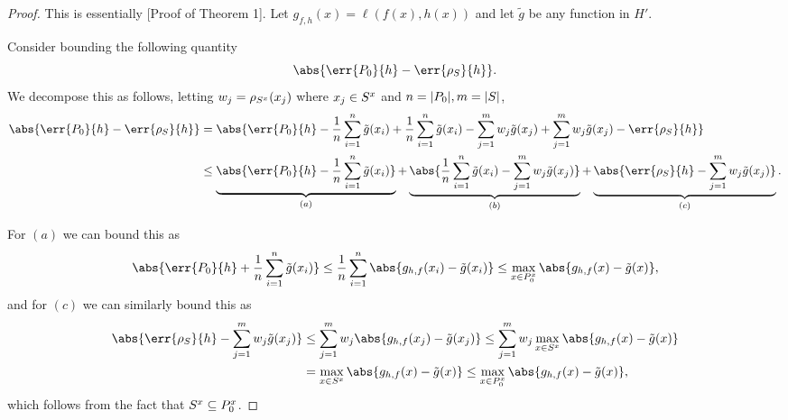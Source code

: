\begin{proof}
  This is essentially \cite{viering17_nuclear_discr_activ_learn}[Proof of Theorem 1].
  Let \(g_{f, h}(x) = \ell(f(x), h(x))\) and let \(\tilde{g}\) be any function in
  \(H'\).

  Consider bounding the following quantity
  \begin{equation*}
    \abs{\err{\poolset_0}{h} - \err{\rho_{\trainset}}{h}}.
  \end{equation*}
  We decompose this as follows, letting \(w_{j} = \rho_{S^x}(x_j)\) where
  \(x_j \in S^x\) and \(n = |P_0|, m = |S|\),
  \begin{align*}
    \abs{\err{\poolset_0}{h} - \err{\rho_{\trainset}}{h}} & = \abs{\err{\poolset_0}{h} - \frac{1}{n} \sum_{i=1}^n\tilde{g}(x_i) + \frac{1}{n} \sum_{i=1}^n\tilde{g}(x_i) - \sum_{j=1}^m w_j \tilde{g}(x_j) + \sum_{j=1}^m w_j \tilde{g}(x_j) - \err{\rho_{\trainset}}{h}} \\
                                                          & \leq \underbrace{\abs{\err{\poolset_0}{h} - \frac{1}{n} \sum_{i=1}^n\tilde{g}(x_i)}}_{(a)} + \underbrace{\abs{\frac{1}{n} \sum_{i=1}^n\tilde{g}(x_i) - \sum_{j=1}^m w_j \tilde{g}(x_j)}}_{(b)} + \underbrace{\abs{\err{\rho_{\trainset}}{h} - \sum_{j=1}^m w_j \tilde{g}(x_j)}}_{(c)}.
  \end{align*}

  For \((a)\) we can bound this as
  \begin{equation*}
    \abs{\err{\poolset_0}{h} + \frac{1}{n} \sum_{i=1}^n\tilde{g}(x_i)} \leq \frac{1}{n} \sum_{i=1}^{n}\abs{g_{h, f}(x_{i}) - \tilde{g}(x_{i})} \leq \max_{x \in \poolsetx_0}\abs{g_{h, f}(x) - \tilde{g}(x)},
  \end{equation*}
  and for \((c)\) we can similarly bound this as
  \begin{align*}
    \abs{\err{\rho_{\trainset}}{h} - \sum_{j=1}^m w_j \tilde{g}(x_j)} & \leq \sum_{j=1}^{m} w_{j}\abs{g_{h, f}(x_{j}) - \tilde{g}(x_{j})} \leq \sum_{j=1}^{m}w_{j}\max_{x \in \trainsetx}\abs{g_{h, f}(x) - \tilde{g}(x)} \\
                                                                      & = \max_{x \in \trainsetx}\abs{g_{h, f}(x) - \tilde{g}(x)} \leq \max_{x \in \poolsetx_0}\abs{g_{h, f}(x) - \tilde{g}(x)},
  \end{align*}
  which follows from the fact that \(S^x \subseteq P^x_{0}\).


\end{proof}
